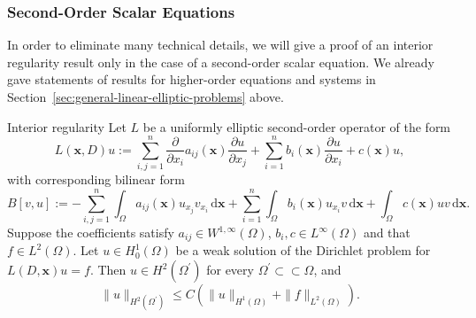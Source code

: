 \subsubsection{Second-Order Scalar Equations}\label{subsec:second-order-scalar-interior-regularity}

In order to eliminate many technical details, we will give a proof of an interior regularity result only in the case of a second-order scalar equation. We already gave statements of results for higher-order equations and systems in Section~\ref{sec:general-linear-elliptic-problems} above.

\begin{Theorem}{Interior regularity}
\label{thm:second-order-interior-regularity}
Let $L$ be a uniformly elliptic second-order operator of the form\[L(\bm{x},D)u:=\sum_{i,j=1}^n\frac{\partial}{\partial x_i}a_{ij}(\bm{x})\frac{\partial u}{\partial x_j}+\sum_{i=1}^nb_i(\bm{x})\frac{\partial u}{\partial x_i}+c(\bm{x})u,\]with corresponding bilinear form\[B[v,u]:=-\sum_{i,j=1}^n\int_\Omega a_{ij}(\bm{x})u_{x_j}v_{x_i}\,\mathrm{d}\bm{x}+\sum_{i=1}^n\int_\Omega b_i(\bm{x})u_{x_i}v\,\mathrm{d}\bm{x}+\int_\Omega c(\bm{x})uv\,\mathrm{d}\bm{x}.\]Suppose the coefficients satisfy $a_{ij}\in W^{1,\infty}(\Omega)$, $b_i,c\in L^\infty(\Omega)$ and that $f\in L^2(\Omega)$. Let $u\in H_0^1(\Omega)$ be a weak solution of the Dirichlet problem for $L(D,\bm{x})u=f$. Then $u\in H^2(\Omega^{\prime})$ for every $\Omega^{\prime}\subset\subset\Omega$, and
\begin{equation}\label{eq:second-order-interior-regularity-h2-estimate}
\|u\|_{H^2(\Omega^{\prime})}\leq C(\|u\|_{H^1(\Omega)}+\|f\|_{L^2(\Omega)}).
\end{equation}

\end{Theorem}


